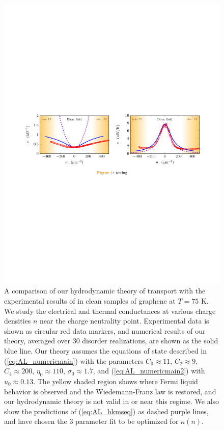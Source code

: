 \begin{figure}
\centering
\includegraphics[width=7in]{figures/hydro_theory/mainfigplot.pdf}
\caption{A comparison of our hydrodynamic theory of transport with the experimental results of \cite{crossno_observation_2016} in clean samples of graphene at $T=75$ K.   We study the electrical and thermal conductances at various charge densities $n$ near the charge neutrality point.  Experimental data is shown as circular red data markers, and numerical results of our theory, averaged over 30 disorder realizations, are shown as the solid blue line.   Our theory assumes the equations of state described in (\ref{eq:AL_numericmain}) with the parameters $C_0\approx 11$, $C_2\approx 9$,  $C_4\approx 200$,  $\eta_0\approx 110$, $\sigma_0\approx 1.7$,  and (\ref{eq:AL_numericmain2}) with $u_0 \approx 0.13$.   The yellow shaded region shows where Fermi liquid behavior is observed and the Wiedemann-Franz law is restored, and our hydrodynamic theory is not valid in or near this regime.   We also show the predictions of (\ref{eq:AL_hkmseq}) as dashed purple lines, and have chosen the 3 parameter fit to be optimized for $\kappa(n)$. }
\label{fig:AL_mainfig}
\end{figure}


